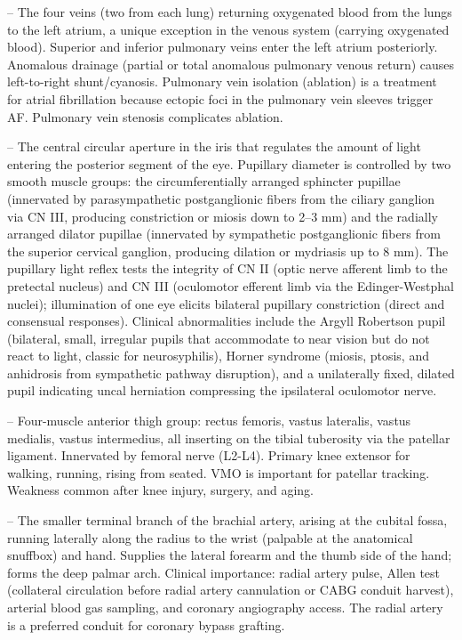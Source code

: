 -- The four veins (two from each lung) returning oxygenated blood from the lungs to the left atrium, a unique exception in the venous system (carrying oxygenated blood). Superior and inferior pulmonary veins enter the left atrium posteriorly. Anomalous drainage (partial or total anomalous pulmonary venous return) causes left-to-right shunt/cyanosis. Pulmonary vein isolation (ablation) is a treatment for atrial fibrillation because ectopic foci in the pulmonary vein sleeves trigger AF. Pulmonary vein stenosis complicates ablation.

-- The central circular aperture in the iris that regulates the amount of light entering the posterior segment of the eye. Pupillary diameter is controlled by two smooth muscle groups: the circumferentially arranged sphincter pupillae (innervated by parasympathetic postganglionic fibers from the ciliary ganglion via CN III, producing constriction or miosis down to 2--3 mm) and the radially arranged dilator pupillae (innervated by sympathetic postganglionic fibers from the superior cervical ganglion, producing dilation or mydriasis up to 8 mm). The pupillary light reflex tests the integrity of CN II (optic nerve afferent limb to the pretectal nucleus) and CN III (oculomotor efferent limb via the Edinger-Westphal nuclei); illumination of one eye elicits bilateral pupillary constriction (direct and consensual responses). Clinical abnormalities include the Argyll Robertson pupil (bilateral, small, irregular pupils that accommodate to near vision but do not react to light, classic for neurosyphilis), Horner syndrome (miosis, ptosis, and anhidrosis from sympathetic pathway disruption), and a unilaterally fixed, dilated pupil indicating uncal herniation compressing the ipsilateral oculomotor nerve.

-- Four-muscle anterior thigh group: rectus femoris, vastus lateralis, vastus medialis, vastus intermedius, all inserting on the tibial tuberosity via the patellar ligament. Innervated by femoral nerve (L2-L4). Primary knee extensor for walking, running, rising from seated. VMO is important for patellar tracking. Weakness common after knee injury, surgery, and aging.

-- The smaller terminal branch of the brachial artery, arising at the cubital fossa, running laterally along the radius to the wrist (palpable at the anatomical snuffbox) and hand. Supplies the lateral forearm and the thumb side of the hand; forms the deep palmar arch. Clinical importance: radial artery pulse, Allen test (collateral circulation before radial artery cannulation or CABG conduit harvest), arterial blood gas sampling, and coronary angiography access. The radial artery is a preferred conduit for coronary bypass grafting.

